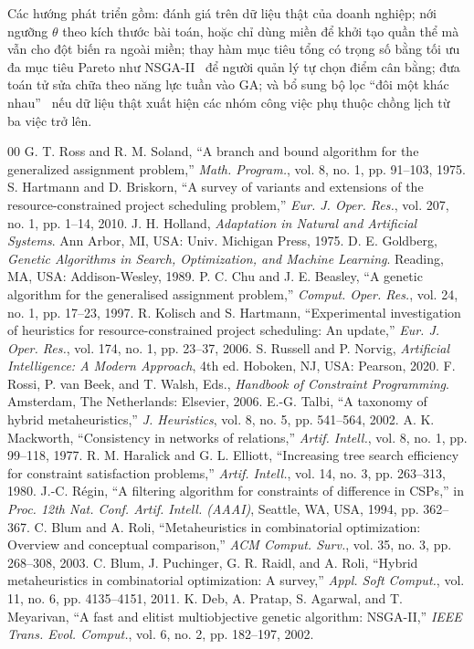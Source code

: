 \documentclass{IEEEtran}
\begin{document}
Các hướng phát triển gồm: đánh giá trên dữ liệu thật của doanh nghiệp; nới ngưỡng $\theta$ theo kích thước bài toán, hoặc chỉ dùng miền để khởi tạo quần thể mà vẫn cho đột biến ra ngoài miền; thay hàm mục tiêu tổng có trọng số bằng tối ưu đa mục tiêu Pareto như NSGA-II~\cite{deb2002} để người quản lý tự chọn điểm cân bằng; đưa toán tử sửa chữa theo năng lực tuần vào GA; và bổ sung bộ lọc ``đôi một khác nhau''~\cite{regin1994} nếu dữ liệu thật xuất hiện các nhóm công việc phụ thuộc chồng lịch từ ba việc trở lên.

\begin{thebibliography}{00}
 G. T. Ross and R. M. Soland, ``A branch and bound algorithm for the generalized assignment problem,'' \textit{Math. Program.}, vol. 8, no. 1, pp. 91--103, 1975.
 S. Hartmann and D. Briskorn, ``A survey of variants and extensions of the resource-constrained project scheduling problem,'' \textit{Eur. J. Oper. Res.}, vol. 207, no. 1, pp. 1--14, 2010.
 J. H. Holland, \textit{Adaptation in Natural and Artificial Systems}. Ann Arbor, MI, USA: Univ. Michigan Press, 1975.
 D. E. Goldberg, \textit{Genetic Algorithms in Search, Optimization, and Machine Learning}. Reading, MA, USA: Addison-Wesley, 1989.
 P. C. Chu and J. E. Beasley, ``A genetic algorithm for the generalised assignment problem,'' \textit{Comput. Oper. Res.}, vol. 24, no. 1, pp. 17--23, 1997.
 R. Kolisch and S. Hartmann, ``Experimental investigation of heuristics for resource-constrained project scheduling: An update,'' \textit{Eur. J. Oper. Res.}, vol. 174, no. 1, pp. 23--37, 2006.
 S. Russell and P. Norvig, \textit{Artificial Intelligence: A Modern Approach}, 4th ed. Hoboken, NJ, USA: Pearson, 2020.
 F. Rossi, P. van Beek, and T. Walsh, Eds., \textit{Handbook of Constraint Programming}. Amsterdam, The Netherlands: Elsevier, 2006.
 E.-G. Talbi, ``A taxonomy of hybrid metaheuristics,'' \textit{J. Heuristics}, vol. 8, no. 5, pp. 541--564, 2002.
 A. K. Mackworth, ``Consistency in networks of relations,'' \textit{Artif. Intell.}, vol. 8, no. 1, pp. 99--118, 1977.
 R. M. Haralick and G. L. Elliott, ``Increasing tree search efficiency for constraint satisfaction problems,'' \textit{Artif. Intell.}, vol. 14, no. 3, pp. 263--313, 1980.
 J.-C. Régin, ``A filtering algorithm for constraints of difference in CSPs,'' in \textit{Proc. 12th Nat. Conf. Artif. Intell. (AAAI)}, Seattle, WA, USA, 1994, pp. 362--367.
 C. Blum and A. Roli, ``Metaheuristics in combinatorial optimization: Overview and conceptual comparison,'' \textit{ACM Comput. Surv.}, vol. 35, no. 3, pp. 268--308, 2003.
 C. Blum, J. Puchinger, G. R. Raidl, and A. Roli, ``Hybrid metaheuristics in combinatorial optimization: A survey,'' \textit{Appl. Soft Comput.}, vol. 11, no. 6, pp. 4135--4151, 2011.
 K. Deb, A. Pratap, S. Agarwal, and T. Meyarivan, ``A fast and elitist multiobjective genetic algorithm: NSGA-II,'' \textit{IEEE Trans. Evol. Comput.}, vol. 6, no. 2, pp. 182--197, 2002.
\end{thebibliography}
\end{document}
